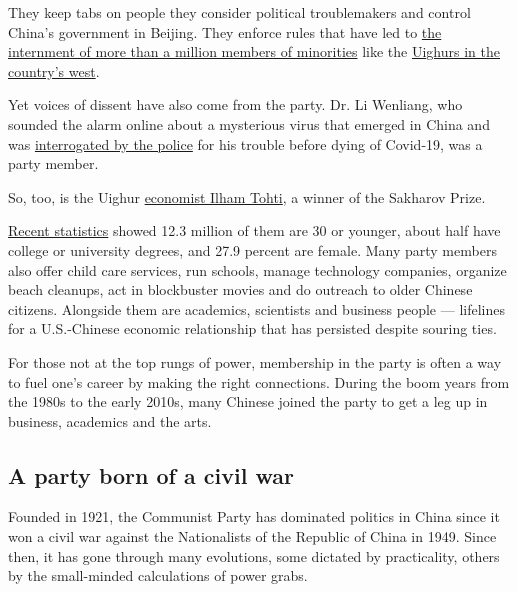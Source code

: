 They keep tabs on people they consider political troublemakers and
control China's government in Beijing. They enforce rules that have led
to
\href{https://www.nytimes.com/interactive/2019/11/16/world/asia/china-xinjiang-documents.html}{the
internment of more than a million members of minorities} like the
\href{https://www.nytimes.com/2020/07/06/world/asia/china-xinjiang-uighur-court.html}{Uighurs
in the country's west}.

Yet voices of dissent have also come from the party. Dr. Li Wenliang,
who sounded the alarm online about a mysterious virus that emerged in
China and was
\href{https://www.nytimes.com/2020/02/06/world/asia/chinese-doctor-Li-Wenliang-coronavirus.html}{interrogated
by the police} for his trouble before dying of Covid-19, was a party
member.

So, too, is the Uighur
\href{https://www.nytimes.com/2016/10/12/world/europe/ilham-tohti-uighur-human-rights-award.html}{economist
Ilham Tohti}, a winner of the Sakharov Prize.

\href{http://www.12371.cn/2020/06/30/ARTI1593514894217396.shtml}{Recent
statistics} showed 12.3 million of them are 30 or younger, about half
have college or university degrees, and 27.9 percent are female. Many
party members also offer child care services, run schools, manage
technology companies, organize beach cleanups, act in blockbuster movies
and do outreach to older Chinese citizens. Alongside them are academics,
scientists and business people --- lifelines for a U.S.-Chinese economic
relationship that has persisted despite souring ties.

For those not at the top rungs of power, membership in the party is
often a way to fuel one's career by making the right connections. During
the boom years from the 1980s to the early 2010s, many Chinese joined
the party to get a leg up in business, academics and the arts.

\hypertarget{a-party-born-of-a-civil-war}{%
\subsection{A party born of a civil
war}\label{a-party-born-of-a-civil-war}}

Founded in 1921, the Communist Party has dominated politics in China
since it won a civil war against the Nationalists of the Republic of
China in 1949. Since then, it has gone through many evolutions, some
dictated by practicality, others by the small-minded calculations of
power grabs.

